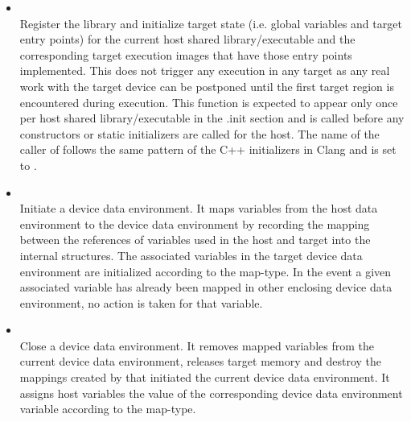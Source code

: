 \begin{itemize}

  \item {}\\

    Register the \libomptarget{} library and initialize target state (i.e. global variables and target entry points) for the current host shared library/executable and the corresponding target execution images that have those entry points implemented. This does not trigger any execution in any target as any real work with the target device can be postponed until the first target region is encountered during execution. This function is expected to appear only once per host shared library/executable in the .init section and is called before any constructors or static initializers are called for the host. The name of the caller of  follows the same pattern of the C++ initializers in Clang and is set to . 

  \item {}\\

    Initiate a device data environment. It maps variables from the host data environment to the device data environment by recording the mapping between the references of variables used in the host and target into the \libomptarget{} internal structures. The associated variables in the target device data environment are initialized according to the map-type. In the event a given associated variable has already been mapped in other enclosing device data environment, no action is taken for that variable.

  \item {}\\

    Close a device data environment. It removes mapped variables from the current device data environment, releases target memory and destroy the mappings created by  that initiated the current device data environment. It assigns host variables the value of the corresponding device data environment variable according to the map-type.


\end{itemize}
